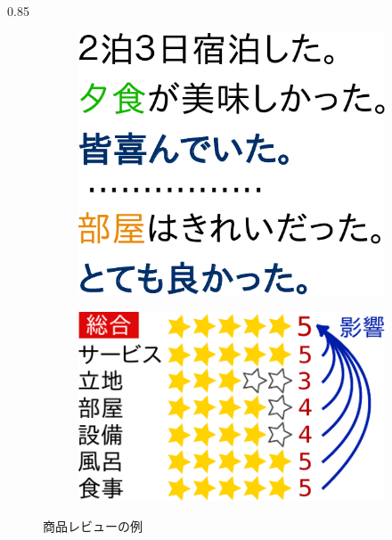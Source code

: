 \documentclass[unicode,10pt]{beamer}
\newlength{\mycolumnwidth}
\begin{document}
\begin{frame}[t]
\begin{columns}[onlytextwidth,t]
\begin{column}{0.85\mycolumnwidth}
  \begin{figure}
    \hspace*{\fill} %
    \begin{subfigure}[t]{0.38\linewidth}
      \includegraphics[width=0.9\linewidth]
                      {fig/relations_among_sentences_v3.pdf}
    \end{subfigure}
    \begin{subfigure}[t]{0.52\linewidth}
      \includegraphics[width=0.9\linewidth]
                      {fig/relations_among_rating_categories_v2.pdf}
    \end{subfigure}
    \hspace*{\fill} %
    \caption*{商品レビューの例}
  \end{figure}


\end{column}
\end{columns}
\end{frame}
\end{document}
